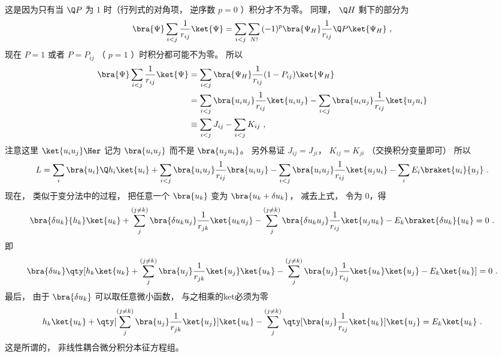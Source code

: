 这是因为只有当 $\Q P$ 为 $1$ 时（行列式的对角项， 逆序数 $p = 0$ ）积分才不为零。 同理， $\Q H$ 剩下的部分为
\begin{equation}
\bra{\Psi}\sum_{i < j} \frac{1}{r_{ij}} \ket{\Psi}  = \sum_{i < j} \sum_{N!} {(-1)^p}\bra{\Psi_H}\frac{1}{r_{ij}} \Q P \ket{\Psi_H}~,
\end{equation}
现在 $P = 1$ 或者 $P = P_{ij}$ （ $p=1$ ）时积分都可能不为零。 所以
\begin{equation}
\begin{aligned}
\bra{\Psi}\sum_{i < j} \frac{1}{r_{ij}} \ket{\Psi} & = \sum_{i < j} \bra{\Psi_H}\frac{1}{r_{ij}}(1 - P_{ij}) \ket{\Psi_H} \\
&= \sum_{i < j} \bra{u_i u_j}\frac{1}{r_{ij}}\ket{u_i u_j}  - \sum_{i < j} \bra{u_i u_j} \frac{1}{r_{ij}} \ket{u_j u_i}\\
& \equiv \sum_{i < j} J_{ij} - \sum_{i < j} K_{ij}~,\\ 
\end{aligned}
\end{equation}
注意这里 $\ket{u_i u_j}\Her$ 记为 $\bra{u_i u_j}$ 而不是 $\bra{u_j u_i}$。  另外易证 $J_{ij} = J_{ji}$， $K_{ij} = K_{ji}$ （交换积分变量即可） 所以
\begin{equation}
L = \sum_i \bra{u_i} \Q h_i \ket{u_i}  + \sum_{i< j} \bra{u_i u_j}\frac{1}{r_{ij}} \bra{u_i u_j}  - \sum_{i < j} \bra{u_i u_j} \frac{1}{r_{ij}} \ket{u_j u_i}   - \sum_i E_i \braket{u_i}{u_j}~.
\end{equation}
现在， 类似于变分法中的过程， 把任意一个 $\bra{u_k}$ 变为 $\bra{u_k + \delta u_k}$，  减去上式， 令为 $0$，得
 \begin{equation}
\bra{\delta u_k}{h_k}\ket{u_k}  + \sum_j^{(j \ne k)} \bra{\delta u_k u_j} \frac{1}{r_{jk}} \ket{u_k u_j}  - \sum_j^{(j \ne k)} \bra{\delta u_k u_j}\frac{1}{r_{ij}}\ket{u_j u_k} - E_k \braket{\delta u_k}{u_k}  = 0~.
\end{equation}
即
 \begin{equation}
\bra{\delta u_k} \qty[h_k \ket{u_k}  + \sum_j^{(j \ne k)} \bra{u_j} \frac{1}{r_{jk}} \ket{u_j} \ket{u_k}  - \sum_j^{(j \ne k)} \bra{u_j}\frac{1}{r_{ij}}\ket{u_k}\ket{u_j}  - E_k\ket{u_k}] = 0~.
\end{equation}
最后， 由于 $\bra{\delta u_k}$ 可以取任意微小函数， 与之相乘的ket必须为零
\begin{equation}
h_k \ket{u_k}  + \qty[\sum_j^{(j \ne k)} \bra{u_j}\frac{1}{r_{jk}} \ket{u_j}] \ket{u_k}  - \sum_j^{(j \ne k)} \qty[\bra{u_j}\frac{1}{r_{ij}} \ket{u_k}] \ket{u_j} = E_k\ket{u_k} ~.
\end{equation}
这是所谓的， 非线性耦合微分积分本征方程组。

